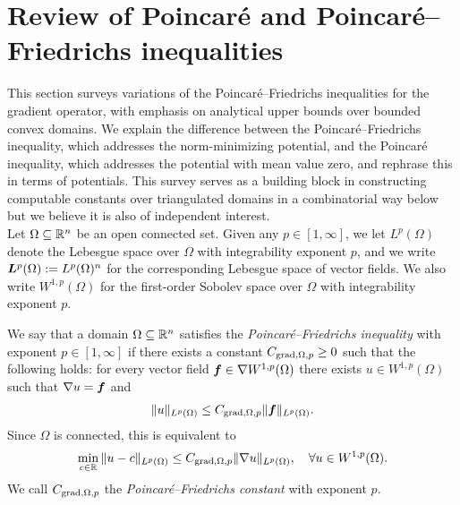 \documentclass[10pt,a4paper]{article}
\begin{document}
\section{Review of Poincar\'e and Poincar\'e--Friedrichs inequalities}\label{section:poincare}

This section surveys variations of the Poincar\'e--Friedrichs inequalities for the gradient operator,
with emphasis on analytical upper bounds over bounded convex domains. 
We explain the difference between the Poincar\'e--Friedrichs inequality, which addresses the norm-minimizing potential, and the Poincar\'e inequality, which addresses the potential with mean value zero, and rephrase this in terms of potentials. 
This survey serves as a building block in constructing computable constants over triangulated domains in a combinatorial way below but we believe it is also of independent interest.
\\

Let $\Omega \subseteq {\mathbb R}^{n}$ be an open connected set. 
Given any $p \in [1,\infty]$, we let $L^{p}(\Omega)$ denote the Lebesgue space over $\Omega$ with integrability exponent $p$, and we write $\bm{L}^{p}(\Omega) := L^{p}(\Omega)^{n}$ for the corresponding Lebesgue space of vector fields. 
We also write $W^{1,p}(\Omega)$ for the first-order Sobolev space over $\Omega$ with integrability exponent $p$. 


We say that a domain $\Omega \subseteq {\mathbb R}^{n}$ satisfies the \emph{Poincar\'e--Friedrichs inequality} with exponent $p \in [1,\infty]$
if there exists a constant $C_{\operatorname{grad},\Omega,p} \geq 0$ such that the following holds:
for every vector field $\bm{f} \in \nabla W^{1,p}(\Omega)$ there exists $u \in W^{1,p}(\Omega)$
such that $\nabla u = \bm{f}$ and 
\begin{align}\label{math:inequalitypf:gradient}
    \| u \|_{L^{p}(\Omega)}
    \leq 
    C_{\operatorname{grad},\Omega,p} 
    \| \bm{f} \|_{L^{p}(\Omega)}
    .
\end{align}
Since $\Omega$ is connected, this is equivalent to  
\begin{align*}
    \min_{ c \in {\mathbb R} } \| u - c \|_{L^{p}(\Omega)}
    \leq 
    C_{\operatorname{grad},\Omega,p} 
    \| \nabla u \|_{L^{p}(\Omega)},
    \quad 
    \forall 
    u \in W^{1,p}(\Omega)
    .
\end{align*}
We call $C_{\operatorname{grad},\Omega,p}$ the \emph{Poincar\'e--Friedrichs constant} with exponent $p$. 
\end{document}
